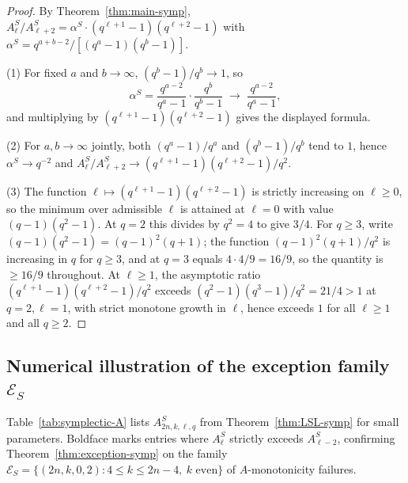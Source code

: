 \documentclass[11pt]{article}
\theoremstyle{plain}
\theoremstyle{remark}
\begin{document}
\begin{proof}
By Theorem~\ref{thm:main-symp},
$A^S_\ell/A^S_{\ell+2} = \alpha^S \cdot (q^{\ell+1}-1)(q^{\ell+2}-1)$ with
$\alpha^S = q^{a+b-2}/[(q^a-1)(q^b-1)]$.

(1) For fixed $a$ and $b \to \infty$, $(q^b - 1)/q^b \to 1$, so
\[
  \alpha^S = \frac{q^{a-2}}{q^a - 1} \cdot \frac{q^b}{q^b - 1}
  \;\longrightarrow\; \frac{q^{a-2}}{q^a - 1},
\]
and multiplying by $(q^{\ell+1}-1)(q^{\ell+2}-1)$ gives the displayed formula.

(2) For $a, b \to \infty$ jointly, both $(q^a - 1)/q^a$ and $(q^b - 1)/q^b$
tend to $1$, hence $\alpha^S \to q^{-2}$ and $A^S_\ell/A^S_{\ell+2} \to
(q^{\ell+1}-1)(q^{\ell+2}-1)/q^2$.

(3) The function $\ell \mapsto (q^{\ell+1}-1)(q^{\ell+2}-1)$ is strictly
increasing on $\ell \geq 0$, so the minimum over admissible $\ell$ is attained
at $\ell = 0$ with value $(q-1)(q^2-1)$. At $q = 2$ this divides by $q^2 = 4$
to give $3/4$. For $q \geq 3$, write $(q-1)(q^2-1) = (q-1)^2(q+1)$; the
function $(q-1)^2(q+1)/q^2$ is increasing in $q$ for $q \geq 3$, and at
$q = 3$ equals $4 \cdot 4/9 = 16/9$, so the quantity is $\geq 16/9$
throughout. At $\ell \geq 1$, the asymptotic ratio
$(q^{\ell+1}-1)(q^{\ell+2}-1)/q^2$ exceeds $(q^2-1)(q^3-1)/q^2 = 21/4 > 1$
at $q = 2, \ell = 1$, with strict monotone growth in $\ell$, hence exceeds
$1$ for all $\ell \geq 1$ and all $q \geq 2$.
\end{proof}

\subsection{Numerical illustration of the exception family
  \texorpdfstring{$\mathcal{E}_S$}{E\_S}}\label{sec:Snum}

Table~\ref{tab:symplectic-A} lists $A^S_{2n,k,\ell,q}$ from
Theorem~\ref{thm:LSL-symp} for small parameters. Boldface marks entries where
$A^S_\ell$ strictly exceeds $A^S_{\ell-2}$, confirming
Theorem~\ref{thm:exception-symp} on the family
$\mathcal{E}_S = \{(2n, k, 0, 2) : 4 \leq k \leq 2n - 4,\ k \text{ even}\}$
of $A$-monotonicity failures.
\end{document}
